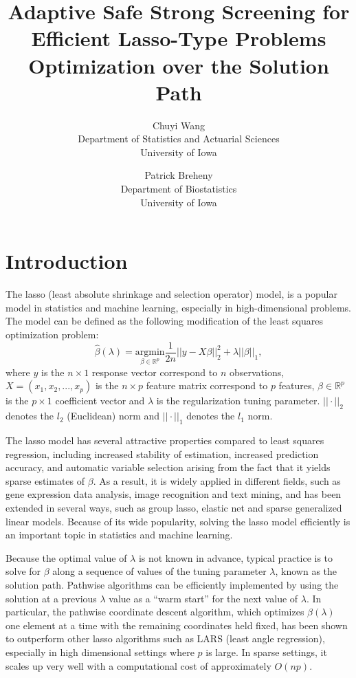 \documentclass{article}
\title{Adaptive Safe Strong Screening for Efficient Lasso-Type
Problems Optimization over the Solution Path}
\author{Chuyi Wang\\Department of Statistics and Actuarial Sciences\\University of Iowa
  \and
  Patrick Breheny\\Department of Biostatistics\\University of Iowa}
\date{}
\begin{document}
\maketitle

\section{Introduction}

The lasso (least absolute shrinkage and selection operator) model\citep{tibshirani1996regression}, is a popular model in statistics and machine learning, especially in high-dimensional problems. The model can be defined as the following modification of the least squares optimization problem:
\begin{equation}
    \hat{\beta}(\lambda)=\underset{\beta\in \mathbb{R}^p}{\mathrm{argmin}}\frac{1}{2n}||y-X\beta||_2^2+\lambda||\beta||_1,
\end{equation}
where $y$ is the $n\times 1$ response vector correspond to $n$ observations, $X=(x_1,x_2,...,x_p)$ is the $n\times p$ feature matrix correspond to $p$ features, $\beta\in \mathbb{R}^p$ is the $p\times 1$ coefficient vector and $\lambda$ is the regularization tuning parameter. $||\cdot||_2$ denotes the $l_2$ (Euclidean) norm and $||\cdot||_1$ denotes the $l_1$ norm. 

The lasso model has several attractive properties compared to least squares regression, including increased stability of estimation, increased prediction accuracy, and automatic variable selection arising from the fact that it yields sparse estimates of $\beta$.  As a result, it is widely applied in different fields, such as gene expression data analysis, image recognition and text mining, and has been extended in several ways, such as group lasso\citep{yuan2006model}, elastic net\citep{zou2005regularization} and sparse generalized linear models. Because of its wide popularity, solving the lasso model efficiently is an important topic in statistics and machine learning.

Because the optimal value of $\lambda$ is not known in advance, typical practice is to solve for $\beta$ along a sequence of values of the tuning parameter $\lambda$, known as the solution path.  Pathwise algorithms can be efficiently implemented by using the solution at a previous $\lambda$ value as a ``warm start'' for the next value of $\lambda$.  In particular, the pathwise coordinate descent algorithm\citep{friedman2007pathwise}, which optimizes $\beta(\lambda)$ one element at a time with the remaining coordinates held fixed, has been shown to outperform other lasso algorithms such as LARS (least angle regression)\citep{efron2004least}, especially in high dimensional settings where $p$ is large. In sparse settings, it scales up very well with a computational cost of approximately $O(np)$. 
\end{document}
